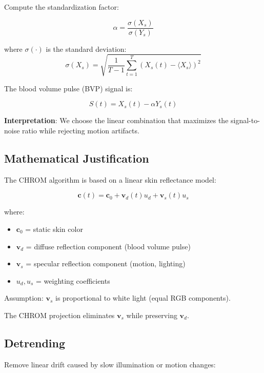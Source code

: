 \documentclass[11pt,a4paper]{article}
\newcommand{\vect}[1]{\bm{#1}}
\begin{document}
Compute the standardization factor:

\begin{equation}
\alpha = \frac{\sigma(X_s)}{\sigma(Y_s)}
\end{equation}

where $\sigma(\cdot)$ is the standard deviation:
\begin{equation}
\sigma(X_s) = \sqrt{\frac{1}{T-1} \sum_{t=1}^{T} (X_s(t) - \langle X_s \rangle)^2}
\end{equation}

The blood volume pulse (BVP) signal is:

\begin{equation}
S(t) = X_s(t) - \alpha Y_s(t)
\end{equation}

\textbf{Interpretation}: We choose the linear combination that maximizes the signal-to-noise ratio while rejecting motion artifacts.

\subsection{Mathematical Justification}

The CHROM algorithm is based on a linear skin reflectance model:

\begin{equation}
\vect{c}(t) = \vect{c}_0 + \vect{v}_d(t) u_d + \vect{v}_s(t) u_s
\end{equation}

where:
\begin{itemize}
    \item $\vect{c}_0$ = static skin color
    \item $\vect{v}_d$ = diffuse reflection component (blood volume pulse)
    \item $\vect{v}_s$ = specular reflection component (motion, lighting)
    \item $u_d, u_s$ = weighting coefficients
\end{itemize}

Assumption: $\vect{v}_s$ is proportional to white light (equal RGB components).

The CHROM projection eliminates $\vect{v}_s$ while preserving $\vect{v}_d$.

\subsection{Detrending}

Remove linear drift caused by slow illumination or motion changes:
\end{document}
